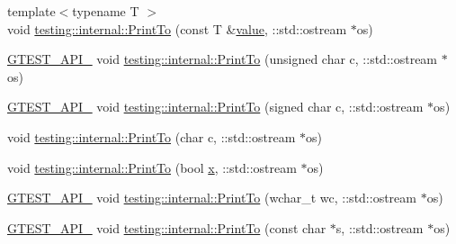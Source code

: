 \begin{DoxyCompactItemize}
\item 
{\footnotesize template$<$typename T $>$ }\\void \mbox{\hyperlink{namespacetesting_1_1internal_adb3c27150dbe661db0e0c4be27533460}{testing\+::internal\+::\+Print\+To}} (const T \&\mbox{\hyperlink{_obj__test_2lib_2googletest-master_2googlemock_2test_2gmock-matchers__test_8cc_a337b8a670efc0b086ad3af163f3121b6}{value}}, \+::std\+::ostream $\ast$os)
\item 
\mbox{\hyperlink{_obj__test_2lib_2googletest-release-1_88_81_2googletest_2include_2gtest_2internal_2gtest-port_8h_aa73be6f0ba4a7456180a94904ce17790}{G\+T\+E\+S\+T\+\_\+\+A\+P\+I\+\_\+}} void \mbox{\hyperlink{namespacetesting_1_1internal_ab7524d6d3ab8c31b1deea88bf61783bb}{testing\+::internal\+::\+Print\+To}} (unsigned char c, \+::std\+::ostream $\ast$os)
\item 
\mbox{\hyperlink{_obj__test_2lib_2googletest-release-1_88_81_2googletest_2include_2gtest_2internal_2gtest-port_8h_aa73be6f0ba4a7456180a94904ce17790}{G\+T\+E\+S\+T\+\_\+\+A\+P\+I\+\_\+}} void \mbox{\hyperlink{namespacetesting_1_1internal_ad453af399370e394881079c243abacb4}{testing\+::internal\+::\+Print\+To}} (signed char c, \+::std\+::ostream $\ast$os)
\item 
void \mbox{\hyperlink{namespacetesting_1_1internal_a476bd3d411d4f129620aaf8999c257c0}{testing\+::internal\+::\+Print\+To}} (char c, \+::std\+::ostream $\ast$os)
\item 
void \mbox{\hyperlink{namespacetesting_1_1internal_a2979ac1ad3e05c51dcd7dca2eb34e6ce}{testing\+::internal\+::\+Print\+To}} (bool \mbox{\hyperlink{_obj__test_2lib_2googletest-master_2googlemock_2test_2gmock-matchers__test_8cc_a6150e0515f7202e2fb518f7206ed97dc}{x}}, \+::std\+::ostream $\ast$os)
\item 
\mbox{\hyperlink{_obj__test_2lib_2googletest-release-1_88_81_2googletest_2include_2gtest_2internal_2gtest-port_8h_aa73be6f0ba4a7456180a94904ce17790}{G\+T\+E\+S\+T\+\_\+\+A\+P\+I\+\_\+}} void \mbox{\hyperlink{namespacetesting_1_1internal_a6c50fd437a2ae2ff6f182ccd6c2744dd}{testing\+::internal\+::\+Print\+To}} (wchar\+\_\+t wc, \+::std\+::ostream $\ast$os)
\item 
\mbox{\hyperlink{_obj__test_2lib_2googletest-release-1_88_81_2googletest_2include_2gtest_2internal_2gtest-port_8h_aa73be6f0ba4a7456180a94904ce17790}{G\+T\+E\+S\+T\+\_\+\+A\+P\+I\+\_\+}} void \mbox{\hyperlink{namespacetesting_1_1internal_ac226053b96d7d61f9407e3b75bab07d9}{testing\+::internal\+::\+Print\+To}} (const char $\ast$s, \+::std\+::ostream $\ast$os)
\item 

\end{DoxyCompactItemize}
